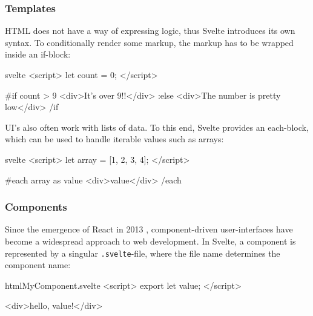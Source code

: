 \s{$}

\subsubsection{Templates}


HTML does not have a way of expressing logic, thus Svelte introduces its own syntax. To conditionally render some markup, the markup has to be wrapped inside an if-block:

\begin{myminted}{svelte}{}
<script>
  let count = 0;
</script>

{#if count > 9}
  <div>It's over 9!!</div>
{:else}
  <div>The number is pretty low</div>
{/if}
\end{myminted}

UI's also often work with lists of data. To this end, Svelte provides an each-block, which can be used to handle iterable values such as arrays:

\begin{myminted}{svelte}{}
<script>
  let array = [1, 2, 3, 4];
</script>

{#each array as value}
  <div>{value}</div>
{/each}
\end{myminted}

\subsubsection{Components}


Since the emergence of React in 2013 \cite{occhino_js_2013}, component-driven user-interfaces have become a widespread approach to web development. In Svelte, a component is represented by a singular \texttt{.svelte}-file, where the file name determines the component name:

\begin{myminted}{html}{MyComponent.svelte}
<script>
  export let value;
</script>

<div>hello, {value}!</div>
\end{myminted}

